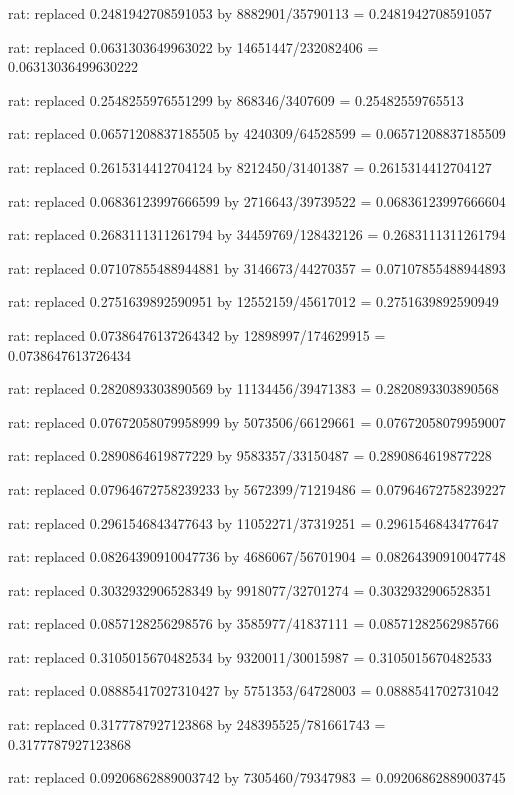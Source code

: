 \documentclass[a4paper,10pt]{article}
\begin{document}
\begin{eulernotebook}
\begin{eulercomment}
\begin{eulercomment}
\begin{eulercomment}
\begin{eulercomment}
\begin{eulercomment}
\begin{eulercomment}
\begin{eulercomment}
\begin{eulercomment}
\begin{eulercomment}
\begin{eulercomment}
\begin{eulercomment}
\begin{eulercomment}
\begin{eulercomment}
\begin{eulercomment}
\begin{eulercomment}
\begin{eulercomment}
\begin{euleroutput}
  rat: replaced 0.2481942708591053 by 8882901/35790113 = 0.2481942708591057
  
  rat: replaced 0.0631303649963022 by 14651447/232082406 = 0.06313036499630222
  
  rat: replaced 0.2548255976551299 by 868346/3407609 = 0.25482559765513
  
  rat: replaced 0.06571208837185505 by 4240309/64528599 = 0.06571208837185509
  
  rat: replaced 0.2615314412704124 by 8212450/31401387 = 0.2615314412704127
  
  rat: replaced 0.06836123997666599 by 2716643/39739522 = 0.06836123997666604
  
  rat: replaced 0.2683111311261794 by 34459769/128432126 = 0.2683111311261794
  
  rat: replaced 0.07107855488944881 by 3146673/44270357 = 0.07107855488944893
  
  rat: replaced 0.2751639892590951 by 12552159/45617012 = 0.2751639892590949
  
  rat: replaced 0.07386476137264342 by 12898997/174629915 = 0.0738647613726434
  
  rat: replaced 0.2820893303890569 by 11134456/39471383 = 0.2820893303890568
  
  rat: replaced 0.07672058079958999 by 5073506/66129661 = 0.07672058079959007
  
  rat: replaced 0.2890864619877229 by 9583357/33150487 = 0.2890864619877228
  
  rat: replaced 0.07964672758239233 by 5672399/71219486 = 0.07964672758239227
  
  rat: replaced 0.2961546843477643 by 11052271/37319251 = 0.2961546843477647
  
  rat: replaced 0.08264390910047736 by 4686067/56701904 = 0.08264390910047748
  
  rat: replaced 0.3032932906528349 by 9918077/32701274 = 0.3032932906528351
  
  rat: replaced 0.0857128256298576 by 3585977/41837111 = 0.08571282562985766
  
  rat: replaced 0.3105015670482534 by 9320011/30015987 = 0.3105015670482533
  
  rat: replaced 0.08885417027310427 by 5751353/64728003 = 0.0888541702731042
  
  rat: replaced 0.3177787927123868 by 248395525/781661743 = 0.3177787927123868
  
  rat: replaced 0.09206862889003742 by 7305460/79347983 = 0.09206862889003745
  

\end{euleroutput}
\end{eulercomment}
\end{eulercomment}
\end{eulercomment}
\end{eulercomment}
\end{eulercomment}
\end{eulercomment}
\end{eulercomment}
\end{eulercomment}
\end{eulercomment}
\end{eulercomment}
\end{eulercomment}
\end{eulercomment}
\end{eulercomment}
\end{eulercomment}
\end{eulercomment}
\end{eulercomment}
\end{eulernotebook}
\end{document}
